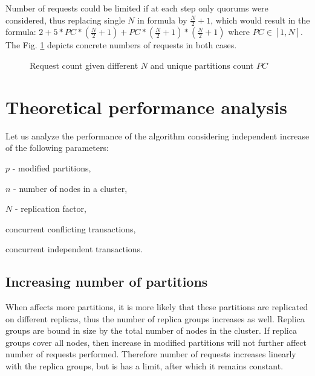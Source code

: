 Number of requests could be limited if at each step only quorums were considered, thus replacing single $N$ in formula by $\frac{N}{2} + 1$, which would result in the formula: 
$2 + 5 * PC*(\frac{N}{2} + 1) + PC * (\frac{N}{2} + 1) * (\frac{N}{2} + 1)$ where $PC \in [1, N]$.
The Fig. \ref{fig:tests:requestsCount} depicts concrete numbers of requests in both cases.


\begin{figure}[hbt]
  \centering
  \setlength{\unitlength}{1.3cm}  
  \caption{Request count given different $N$ and unique partitions count $PC$}
  \label{fig:tests:requestsCount}
\end{figure}

\section{Theoretical performance analysis}
Let us analyze the performance of the \mpt algorithm considering independent increase of the following parameters: 
\begin{enumerate*}
\item $p$ - modified partitions,
\item $n$ - number of nodes in a cluster,
\item $N$ - replication factor,
\item concurrent conflicting transactions,
\item concurrent independent transactions.
\end{enumerate*}

\subsection{Increasing number of partitions}
\label{sec:tests:perf:partitions}
When \mpt affects more partitions, it is more likely that these partitions are replicated on different replicas, thus the number of replica groups increases as well. Replica groups are bound in size by the total number of nodes in the cluster. If replica groups cover all nodes, then increase in modified partitions will not further affect number of requests performed. Therefore number of requests increases linearly with the replica groups, but is has a limit, after which it remains constant.

